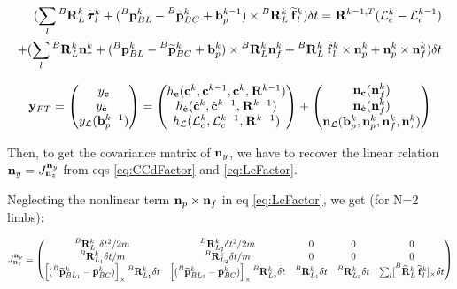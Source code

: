 \documentclass[11pt]{article}
\newcommand{\Rot}[2]{\prescript{#1}{}{\bfR}_{#2}}
\newcommand{\Rotm}[2]{\prescript{#1}{}{\widetilde{\bfR}}_{#2}}
\newcommand{\noise}{\bfn}
\newcommand{\bias}{\bfb}
\newcommand{\posi}[2]{\prescript{#1}{}{\bfp}_{#2}}
\newcommand{\posim}[2]{\prescript{#1}{}{\widetilde{\bfp}}_{#2}}
\newcommand{\posibar}{\bar{\bfp}}
\newcommand{\forcem}[2]{\prescript{#1}{}{\widetilde{\bff}}_{#2}}
\newcommand{\torquem}[2]{\prescript{#1}{}{\widetilde{\pmb{\tau}}}_{#2}}
\newcommand{\AM}{\mathcal{L}}
\newcommand{\COM}{\bfc}
\newcommand{\COMd}{\dot{\bfc}}
\begin{document}
\begin{small}
\begin{equation}
\begin{split}
	(\sum_l \Rot{B}{L}^{k}\torquem{}{l}^{k} + (\posi{B}{BL}^{k} - \posim{B}{BC}^{k} + \bias_{p}^{k-1}) \times \Rot{B}{L}^{k}\forcem{}{l}^{k}) \delta t = 
	\Rot{}{}^{k-1,T}(\AM_c^{k} - \AM_c^{k-1})
	\\
	+ (\sum_l \Rot{B}{L}^{k}\noise_{\tau}^{k} + (\posi{B}{BL}^{k} - \posim{B}{BC}^{k} + \bias_{p}^{k})\times \Rot{B}{L}^{k}\noise_f^{k}  + \Rot{B}{L}^{k}\forcem{}{l}^{k}  \times \noise_p^{k} + \noise^k_p \times \noise^k_f)\delta t
\end{split}
\label{eq:LcFactor}
\end{equation}
\end{small}

\begin{equation}
\bfy_{FT} =
\begin{pmatrix}
y_{\COM} \\ y_{\COMd} \\ y_{\AM}(\bias_{p}^{k-1})
\end{pmatrix}
=
\begin{pmatrix}
h_{\COM}(\COM^{k}, \COM^{k-1}, \COMd^{k}, \Rot{}{}^{k-1})
\\
h_{\COMd}(\COMd^{k}, \COMd^{k-1}, \Rot{}{}^{k-1}) 
\\
h_{\AM}(\AM_c^{k}, \AM_c^{k-1}, \Rot{}{}^{k-1})
\end{pmatrix}
+
\begin{pmatrix}
\noise_{\COM}(\noise_f^{k})
\\
\noise_{\COMd}(\noise_f^{k})
\\
\noise_{\AM}(\bias_{p}^k, \noise_p^k, \noise_f^{k}, \noise_\tau^{k})
\end{pmatrix}
\end{equation}

Then, to get the covariance matrix of $\noise_y$, we have to recover the linear relation $\noise_y = J^{\noise_y}_{\noise_z}$ from eqs \ref{eq:CCdFactor} and \ref{eq:LcFactor}.

Neglecting the nonlinear term $\noise_p \times \noise_f$ in eq \ref{eq:LcFactor}, we get (for N=2 limbs):

\begin{equation}
	J^{\noise_y}_{\noise_z} =
	\begin{pmatrix}
    \Rot{B}{L_1}^k \delta t^2/2m & \Rot{B}{L_2}^k \delta t^2/2m & 0 & 0 & 0 
    \\
    \Rot{B}{L_1}^k \delta t/m & \Rot{B}{L_2}^k \delta t/m & 0 & 0 & 0 
    \\
    \left[(\posim{B}{BL_1}^k - \posibar_{BC}^k) \right]_{\times} \Rot{B}{L_1}^k \delta t & \left[(\posim{B}{BL_2}^k - \posibar_{BC}^k) \right]_{\times} \Rot{B}{L_2}^k \delta t & \Rot{B}{L_1}^k \delta t & \Rot{B}{L_2}^k \delta t & \sum_l [\Rotm{B}{L}^k \forcem{}{l}^k]_{\times} \delta t
	\end{pmatrix}
\end{equation}
\end{document}
